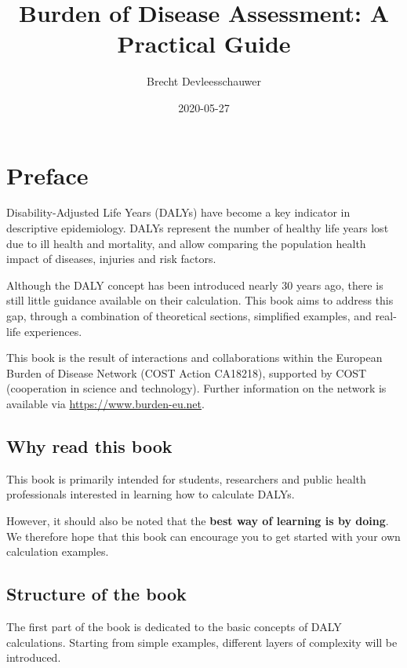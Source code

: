 \documentclass[]{book}
\title{Burden of Disease Assessment: A Practical Guide}
\author{Brecht Devleesschauwer}
\date{2020-05-27}
\begin{document}
\maketitle

{
\setcounter{tocdepth}{1}
\tableofcontents
}
\chapter*{Preface}\label{preface}

Disability-Adjusted Life Years (DALYs) have become a key indicator in
descriptive epidemiology. DALYs represent the number of healthy life
years lost due to ill health and mortality, and allow comparing the
population health impact of diseases, injuries and risk factors.

Although the DALY concept has been introduced nearly 30 years ago, there
is still little guidance available on their calculation. This book aims
to address this gap, through a combination of theoretical sections,
simplified examples, and real-life experiences.

This book is the result of interactions and collaborations within the
European Burden of Disease Network (COST Action CA18218), supported by
COST (cooperation in science and technology). Further information on the
network is available via \url{https://www.burden-eu.net}.

\section*{Why read this book}\label{why-read-this-book}

This book is primarily intended for students, researchers and public
health professionals interested in learning how to calculate DALYs.

However, it should also be noted that the \textbf{best way of learning
is by doing}. We therefore hope that this book can encourage you to get
started with your own calculation examples.

\section*{Structure of the book}\label{structure-of-the-book}

The first part of the book is dedicated to the basic concepts of DALY
calculations. Starting from simple examples, different layers of
complexity will be introduced.
\end{document}
